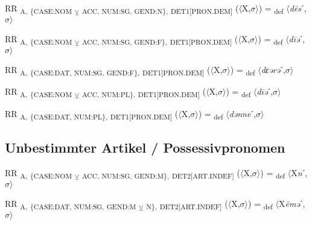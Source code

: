 {\begin{exe}
 RR \textsubscript{A,} \textsubscript{\{CASE:NOM} \textsubscript{${\veebar}$}\textsubscript{ ACC, NUM:SG, GEND:N\},} \textsubscript{DET1[PRON.DEM]} ($\langle$X,$\sigma $$\rangle$) = \textsubscript{def} $\langle$\textit{d\=es}ˊ,$\sigma $$\rangle$
\end{exe}

\begin{exe}
 RR \textsubscript{A,} \textsubscript{\{CASE:NOM} \textsubscript{${\veebar}$}\textsubscript{ ACC, NUM:SG, GEND:F\},} \textsubscript{DET1[PRON.DEM]} ($\langle$X,$\sigma $$\rangle$) = \textsubscript{def} $\langle$\textit{d\=iə}ˊ,$\sigma $$\rangle$
\end{exe}

\begin{exe}
 RR \textsubscript{A,} \textsubscript{\{CASE:DAT, NUM:SG, GEND:F\},} \textsubscript{DET1[PRON.DEM]} ($\langle$X,$\sigma $$\rangle$) = \textsubscript{def} $\langle$\textit{dɛərə}ˊ,$\sigma $$\rangle$
\end{exe}

\begin{exe}
 RR \textsubscript{A,} \textsubscript{\{CASE:NOM} \textsubscript{${\veebar}$}\textsubscript{ ACC, NUM:PL\},} \textsubscript{DET1[PRON.DEM]} ($\langle$X,$\sigma $$\rangle$) = \textsubscript{def} $\langle$\textit{d\=iə}ˊ,$\sigma $$\rangle$
\end{exe}

\begin{exe}
 RR \textsubscript{A,} \textsubscript{\{CASE:DAT, NUM:PL\},} \textsubscript{DET1[PRON.DEM]} ($\langle$X,$\sigma $$\rangle$) = \textsubscript{def} $\langle$\textit{dənne}ˊ,$\sigma $$\rangle$
\end{exe}

\subsection{Unbestimmter Artikel / Possessivpronomen}

\begin{exe}
 RR \textsubscript{A,} \textsubscript{\{CASE:NOM} \textsubscript{${\veebar}$}\textsubscript{ ACC, NUM:SG, GEND:M\},} \textsubscript{DET2[ART.INDEF]} ($\langle$X,$\sigma $$\rangle$) = \textsubscript{def} $\langle$X\textit{n}ˊ,$\sigma $$\rangle$
\end{exe}

\begin{exe}
 RR \textsubscript{A,} \textsubscript{\{CASE:DAT, NUM:SG, GEND:M} \textsubscript{${\veebar}$}\textsubscript{ N\},} \textsubscript{DET2[ART.INDEF]} ($\langle$X,$\sigma $$\rangle$) = \textsubscript{def} $\langle$X\textit{ẽmə}ˊ,$\sigma $$\rangle$
\end{exe}

}
